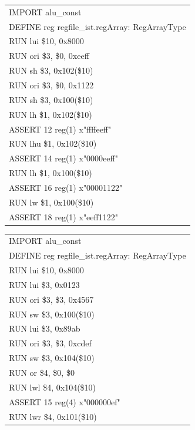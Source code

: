 \documentclass[11pt,utf8]{article}
\begin{document}
{{{{\begin{center}
\begin{longtable}{p{15cm}}
		\hline \end{longtable} \end{center}
\begin{center}	\begin{longtable}{p{15cm}} \hline
		IMPORT{ }alu\_const\\
		DEFINE{ }reg{ }regfile\_ist.regArray:{ }RegArrayType\\
		RUN{ }lui{ }\$10,{ }0x8000\\
		RUN{ }ori{ }\$3,{ }\$0,{ }0xeeff\\
		RUN{ }sh{ }{ }\$3,{ }0x102(\$10)\\
		RUN{ }ori{ }\$3,{ }\$0,{ }0x1122\\
		RUN{ }sh{ }{ }\$3,{ }0x100(\$10)\\
		RUN{ }lh{ }{ }\$1,{ }0x102(\$10)\\
		ASSERT{ }12{ }reg(1){ }x"ffffeeff"\\
		RUN{ }lhu{ }\$1,{ }0x102(\$10)\\
		ASSERT{ }14{ }reg(1){ }x"0000eeff"\\
		RUN{ }lh{ }{ }\$1,{ }0x100(\$10)\\
		ASSERT{ }16{ }reg(1){ }x"00001122"\\
		RUN{ }lw{ }{ }\$1,{ }0x100(\$10)\\
		ASSERT{ }18{ }reg(1){ }x"eeff1122"\\
		\hline \end{longtable} \end{center}
\begin{center}	\begin{longtable}{p{15cm}} \hline
		IMPORT{ }alu\_const\\
		DEFINE{ }reg{ }regfile\_ist.regArray:{ }RegArrayType\\
		RUN{ }lui{ }\$10,{ }0x8000\\
		RUN{ }lui{ }\$3,{ }0x0123\\
		RUN{ }ori{ }\$3,{ }\$3,{ }0x4567\\
		RUN{ }sw{ }{ }\$3,{ }0x100(\$10)\\
		RUN{ }lui{ }\$3,{ }0x89ab\\
		RUN{ }ori{ }\$3,{ }\$3,{ }0xcdef\\
		RUN{ }sw{ }{ }\$3,{ }0x104(\$10)\\
		RUN{ }or{ }{ }\$4,{ }\$0,{ }\$0\\
		RUN{ }lwl{ }\$4,{ }0x104(\$10)\\
		ASSERT{ }15{ }reg(4){ }x"000000ef"\\
		RUN{ }lwr{ }\$4,{ }0x101(\$10)\\

\end{longtable}
\end{center}}}}}
\end{document}
